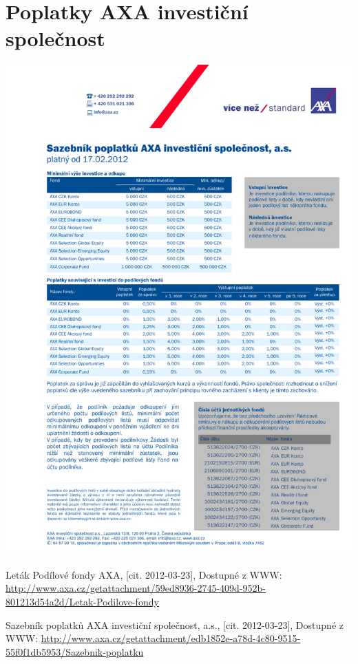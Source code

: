 \documentclass[a4paper,12pt]{article}
\begin{document}
\clearpage
\appendix
\section{Poplatky AXA investiční společnost \cite{axa_cite}}
\label{axa}	
\includegraphics[width=1.0\textwidth]{axa.pdf}
\renewcommand{\bibname}{Seznam použité literatury}
\begin{thebibliography}{9}
\thispagestyle{plain}

Leták Podílové fondy AXA, [cit. 2012-03-23], Dostupné z WWW:  \url{http://www.axa.cz/getattachment/59ed8936-2745-409d-952b-801213d54a2d/Letak-Podilove-fondy}


Sazebník poplatků AXA investiční společnost, a.s., [cit. 2012-03-23], Dostupné z WWW:  \url{http://www.axa.cz/getattachment/edb1852e-a78d-4c80-9515-55f0f1db5953/Sazebnik-poplatku}
\end{thebibliography}
\end{document}
